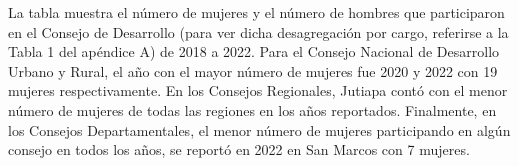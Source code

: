 \justifying La tabla muestra el número de mujeres y el número de hombres que participaron en el Consejo de Desarrollo (para ver dicha desagregación por cargo, referirse a la Tabla 1 del apéndice A) de  2018 a 2022. Para el Consejo Nacional de Desarrollo Urbano y Rural, el año con el mayor número de mujeres fue 2020 y 2022 con 19 mujeres respectivamente. En los Consejos Regionales, Jutiapa contó con el menor número de mujeres de todas las regiones en los años reportados. Finalmente, en los Consejos Departamentales, el menor número de mujeres participando en algún consejo en todos los años, se reportó en 2022 en San Marcos con 7 mujeres. 